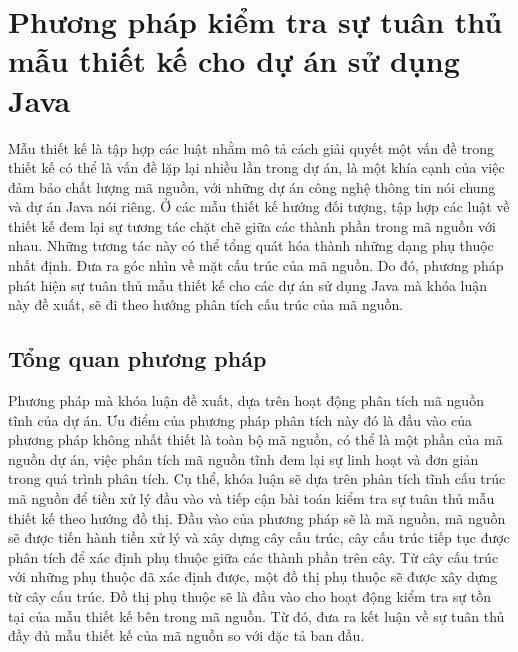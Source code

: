 \documentclass[12pt]{report}
\begin{document}
\chapter{Phương pháp kiểm tra sự tuân thủ mẫu thiết kế cho dự án sử dụng Java}\noindent Mẫu thiết kế là tập hợp các luật nhằm mô tả cách giải quyết một vấn đề trong thiết kế có thể là vấn đề lặp lại nhiều lần trong dự án, là một khía cạnh của việc đảm bảo chất lượng mã nguồn, với những dự án công nghệ thông tin nói chung và dự án Java nói riêng. Ở các mẫu thiết kế hướng đối tượng, tập hợp các luật về thiết kế đem lại sự tương tác chặt chẽ giữa các thành phần trong mã nguồn với nhau. Những tương tác này có thể tổng quát hóa thành những dạng phụ thuộc nhất định. Đưa ra góc nhìn về mặt cấu trúc của mã nguồn. Do đó, phương pháp phát hiện sự tuân thủ mẫu thiết kế cho các dự án sử dụng Java mà khóa luận này đề xuất, sẽ đi theo hướng phân tích cấu trúc của mã nguồn.

\section{Tổng quan phương pháp}
Phương pháp mà khóa luận đề xuất, dựa trên hoạt động phân tích mã nguồn tĩnh của dự án. Ưu điểm của phương pháp phân tích này đó là đầu vào của phương pháp không nhất thiết là toàn bộ mã nguồn, có thể là một phần của mã nguồn dự án, việc phân tích mã nguồn tĩnh đem lại sự linh hoạt và đơn giản trong quá trình phân tích. Cụ thể, khóa luận sẽ dựa trên phân tích tĩnh cấu trúc mã nguồn để tiền xử lý đầu vào và tiếp cận bài toán kiểm tra sự tuân thủ mẫu thiết kế theo hướng đồ thị.
Đầu vào của phương pháp sẽ là mã nguồn, mã nguồn sẽ được tiến hành tiền xử lý và xây dựng cây cấu trúc, cây cấu trúc tiếp tục được phân tích để xác định phụ thuộc giữa các thành phần trên cây. Từ cây cấu trúc với những phụ thuộc đã xác định được, một đồ thị phụ thuộc sẽ được xây dựng từ cây cấu trúc. Đồ thị phụ thuộc sẽ là đầu vào cho hoạt động kiểm tra sự tồn tại của mẫu thiết kế bên trong mã nguồn. Từ đó, đưa ra kết luận về sự tuân thủ đầy đủ mẫu thiết kế của mã nguồn so với đặc tả ban đầu.
\end{document}
